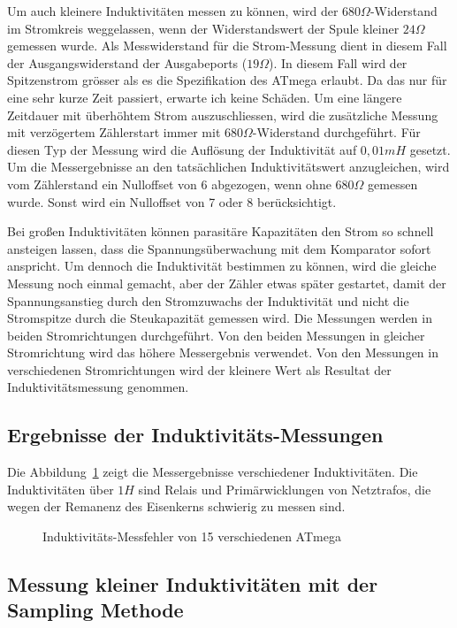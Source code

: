 Um auch kleinere Induktivitäten messen zu können, wird der \(680\Omega\)-Widerstand im Stromkreis weggelassen,
wenn der Widerstandswert der Spule kleiner \(24\Omega\) gemessen wurde. Als Messwiderstand für die Strom-Messung
dient in diesem Fall der Ausgangswiderstand der Ausgabeports (\(19\Omega\)). In diesem Fall wird der Spitzenstrom grösser
als es die Spezifikation des ATmega erlaubt. Da das nur für eine sehr kurze Zeit passiert, erwarte ich keine Schäden.
Um eine längere Zeitdauer mit überhöhtem Strom auszuschliessen, wird die zusätzliche Messung mit 
verzögertem Zählerstart immer mit \(680\Omega\)-Widerstand durchgeführt.
Für diesen Typ der Messung wird die Auflösung der Induktivität auf \(0,01mH\) gesetzt.
Um die Messergebnisse an den tatsächlichen Induktivitätswert anzugleichen, wird vom Zählerstand ein
Nulloffset von 6 abgezogen, wenn ohne \(680\Omega\) gemessen wurde. Sonst wird ein Nulloffset von 7 oder 8 berücksichtigt.


Bei großen Induktivitäten können parasitäre Kapazitäten den Strom so schnell ansteigen lassen, dass
die Spannungsüberwachung mit dem Komparator sofort anspricht. Um dennoch die Induktivität bestimmen zu
können, wird die gleiche Messung noch einmal gemacht, aber der Zähler etwas später gestartet, damit
der Spannungsanstieg durch den Stromzuwachs der Induktivität und nicht die Stromspitze durch die
Steukapazität gemessen wird.
Die Messungen werden in beiden Stromrichtungen durchgeführt.
Von den beiden Messungen in gleicher Stromrichtung wird das höhere Messergebnis verwendet.
Von den Messungen in verschiedenen Stromrichtungen wird der kleinere Wert als Resultat der Induktivitätsmessung genommen.

\subsection{Ergebnisse der Induktivitäts-Messungen}
Die Abbildung~\ref{fig:Induct328p} zeigt die Messergebnisse verschiedener Induktivitäten.
Die Induktivitäten über \(1 H\) sind Relais und Primärwicklungen von Netztrafos, die wegen
der Remanenz des Eisenkerns schwierig zu messen sind.

\begin{figure}[H]
\centering

\caption{Induktivitäts-Messfehler von 15 verschiedenen ATmega}
\label{fig:Induct328p}
\end{figure}

\subsection{Messung kleiner Induktivitäten mit der Sampling Methode}

